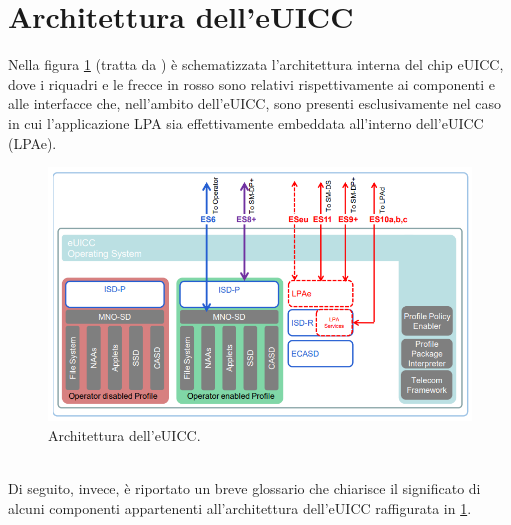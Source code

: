 \documentclass[10pt, twoside, openany]{book}
\begin{document}
\section{Architettura dell'eUICC}
Nella figura \ref{fig:eUICC-arch} (tratta da \cite{GSMA-docs}) è schematizzata l'architettura interna del chip eUICC, dove i riquadri e le frecce in rosso sono relativi rispettivamente ai componenti e alle interfacce che, nell'ambito dell'eUICC, sono presenti esclusivamente nel caso in cui l'applicazione LPA sia effettivamente embeddata all'interno dell'eUICC (LPAe).
\begin{figure}
\includegraphics[width=\linewidth]{eUICC-arch.png}
\caption{Architettura dell'eUICC.}
\label{fig:eUICC-arch}
\end{figure}
\\Di seguito, invece, è riportato un breve glossario che chiarisce il significato di alcuni componenti appartenenti all'architettura dell'eUICC raffigurata in \ref{fig:eUICC-arch}.
\end{document}
